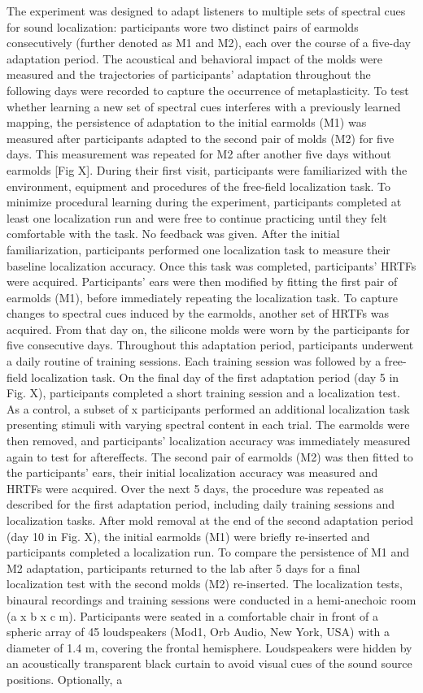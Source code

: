 The experiment was designed to adapt listeners to multiple sets of spectral cues for sound localization: participants wore two distinct pairs of earmolds consecutively (further denoted as M1 and M2), each over the course of a five-day adaptation period. The acoustical and behavioral impact of the molds were measured and the trajectories of participants’ adaptation throughout the following days were recorded to capture the occurrence of metaplasticity. To test whether learning a new set of spectral cues interferes with a previously learned mapping, the persistence of adaptation to the initial earmolds (M1) was measured after participants adapted to the second pair of molds (M2) for five days. This measurement was repeated for M2 after another five days without earmolds [Fig X]. During their first visit, participants were familiarized with the environment, equipment and procedures of the free-field localization task. To minimize procedural learning during the experiment, participants completed at least one localization run and were free to continue practicing until they felt comfortable with the task. No feedback was given. After the initial familiarization, participants performed one localization task to measure their baseline localization accuracy. Once this task was completed, participants’ HRTFs were acquired. Participants’ ears were then modified by fitting the first pair of earmolds (M1), before immediately repeating the localization task. To capture changes to spectral cues induced by the earmolds, another set of HRTFs was acquired. From that day on, the silicone molds were worn by the participants for five consecutive days. Throughout this adaptation period, participants underwent a daily routine of training sessions. Each training session was followed by a free-field localization task. On the final day of the first adaptation period (day 5 in Fig. X), participants completed a short training session and a localization test. As a control, a subset of x participants performed an additional localization task presenting stimuli with varying spectral content in each trial. The earmolds were then removed, and participants’ localization accuracy was immediately measured again to test for aftereffects. The second pair of earmolds (M2) was then fitted to the participants’ ears, their initial localization accuracy was measured and HRTFs were acquired. Over the next 5 days, the procedure was repeated as described for the first adaptation period, including daily training sessions and localization tasks. After mold removal at the end of the second adaptation period (day 10 in Fig. X), the initial earmolds (M1) were briefly re-inserted and participants completed a localization run. To compare the persistence of M1 and M2 adaptation, participants returned to the lab after 5 days for a final localization test with the second molds (M2) re-inserted. The localization tests, binaural recordings and training sessions were conducted in a hemi-anechoic room (a x b x c m). Participants were seated in a comfortable chair in front of a spheric array of 45 loudspeakers (Mod1, Orb Audio, New York, USA) with a diameter of 1.4 m, covering the frontal hemisphere. Loudspeakers were hidden by an acoustically transparent black curtain to avoid visual cues of the sound source positions. Optionally, a 